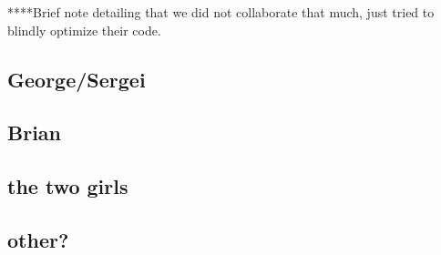 \documentclass{article}
\begin{document}
****Brief note detailing that we did not collaborate that much, just tried to blindly optimize their code.

\subsection{George/Sergei}

\subsection{Brian}

\subsection{the two girls}

\subsection{other?}
\end{document}

